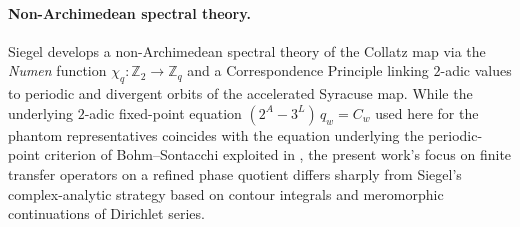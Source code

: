 \documentclass[11pt,a4paper]{article}
\theoremstyle{definition}
\newcommand{\Z}{\mathbb{Z}}
\newcommand{\Zp}{\mathbb{Z}_2}
\begin{document}
\paragraph{Non-Archimedean spectral theory.}
Siegel \cite{siegel2023a,siegel2023b,siegel2026hydra} develops a
non-Archimedean spectral theory of the Collatz map via the
\emph{Numen} function $\chi_q\colon \Zp \to \Z_q$ and a
Correspondence Principle linking $2$-adic values to periodic and
divergent orbits of the accelerated Syracuse map. While the
underlying $2$-adic fixed-point equation
$(2^A - 3^L)\, q_w = C_w$ used here for the phantom representatives
coincides with the equation underlying the periodic-point criterion
of Bohm--Sontacchi exploited in \cite{siegel2023a}, the present
work's focus on finite transfer operators on a refined phase
quotient differs sharply from Siegel's complex-analytic strategy
based on contour integrals and meromorphic continuations of
Dirichlet series.
\end{document}
